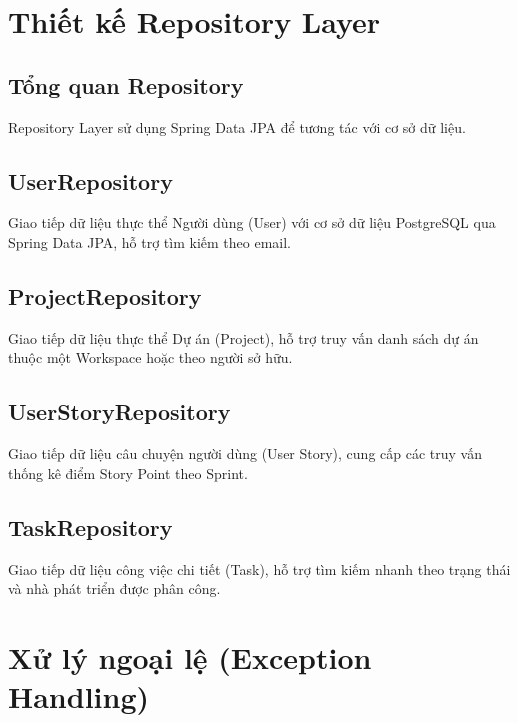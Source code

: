 \documentclass[12pt,a4paper]{report}
\begin{document}
\section{Thiết kế Repository Layer}

\subsection{Tổng quan Repository}

Repository Layer sử dụng Spring Data JPA để tương tác với cơ sở dữ liệu.

\subsection{UserRepository}

Giao tiếp dữ liệu thực thể Người dùng (User) với cơ sở dữ liệu PostgreSQL qua Spring Data JPA, hỗ trợ tìm kiếm theo email.

\subsection{ProjectRepository}

Giao tiếp dữ liệu thực thể Dự án (Project), hỗ trợ truy vấn danh sách dự án thuộc một Workspace hoặc theo người sở hữu.

\subsection{UserStoryRepository}

Giao tiếp dữ liệu câu chuyện người dùng (User Story), cung cấp các truy vấn thống kê điểm Story Point theo Sprint.

\subsection{TaskRepository}

Giao tiếp dữ liệu công việc chi tiết (Task), hỗ trợ tìm kiếm nhanh theo trạng thái và nhà phát triển được phân công.

\section{Xử lý ngoại lệ (Exception Handling)}
\end{document}
